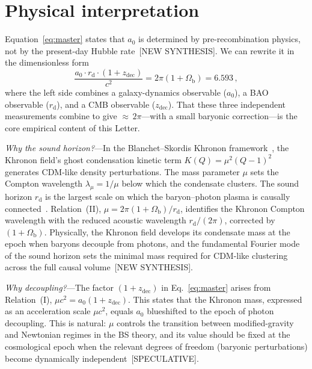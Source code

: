 \documentclass[prl,twocolumn,superscriptaddress,longbibliography]{revtex4-2}
\newcommand{\zdec}{z_{\mathrm{dec}}}
\newcommand{\rd}{r_{\mathrm{d}}}
\newcommand{\Ob}{\Omega_{\mathrm{b}}}
\newcommand{\azero}{a_0}
\begin{document}
\section{Physical interpretation}
\label{sec:interpretation}

Equation~\eqref{eq:master} states that $\azero$ is
determined by pre-recombination physics,
not by the present-day Hubble
rate~[NEW SYNTHESIS].
We can rewrite it in the dimensionless form
\begin{equation}
  \frac{\azero \cdot \rd \cdot (1+\zdec)}{c^2}
  = 2\pi(1+\Ob)
  = 6.593 \,,
  \label{eq:dimensionless}
\end{equation}
where the left side combines a galaxy-dynamics
observable ($\azero$), a BAO observable ($\rd$),
and a CMB observable ($\zdec$).
That these three independent measurements
combine to give ${\approx}\,2\pi$---with a small
baryonic correction---is the core empirical content
of this Letter.

\emph{Why the sound horizon?}---In the
Blanchet--Skordis Khronon framework~\cite{BS2024,BS2025},
the Khronon field's ghost condensation kinetic term
$K(Q) = \mu^2(Q-1)^2$ generates CDM-like density
perturbations.
The mass parameter $\mu$ sets the Compton wavelength
$\lambda_\mu = 1/\mu$ below which the condensate clusters.
The sound horizon $\rd$ is the largest scale on which
the baryon--photon plasma is causally
connected~\cite{EH1998}.
Relation~(II), $\mu = 2\pi(1+\Ob)/\rd$, identifies
the Khronon Compton wavelength with the reduced
acoustic wavelength $\rd/(2\pi)$, corrected by
$(1+\Ob)$.
Physically, the Khronon field develops its condensate
mass at the epoch when baryons decouple from photons,
and the fundamental Fourier mode of the sound horizon
sets the minimal mass required for CDM-like clustering
across the full causal volume~[NEW SYNTHESIS].

\emph{Why decoupling?}---The factor $(1+\zdec)$
in Eq.~\eqref{eq:master} arises from
Relation~(I), $\mu c^2 = \azero(1+\zdec)$.
This states that the Khronon mass, expressed as
an acceleration scale $\mu c^2$, equals $\azero$
blueshifted to the epoch of photon decoupling.
This is natural: $\mu$ controls the transition
between modified-gravity and Newtonian regimes in the
BS theory, and its value should be fixed at the
cosmological epoch when the relevant degrees of
freedom (baryonic perturbations) become dynamically
independent~[SPECULATIVE].
\end{document}
